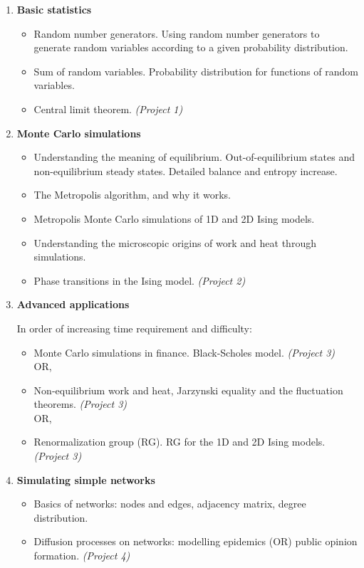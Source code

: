 \documentclass[12pt]{mcplain}
\begin{document}
\begin{enumerate}
    \item \textbf{Basic statistics}
    
    \begin{itemize}
        \item Random number generators. Using random number generators to generate random variables according to a given probability distribution.
        \item Sum of random variables. Probability distribution for functions of random variables.
        \item Central limit theorem. \textit{(Project 1)}
    \end{itemize}
    
    \item \textbf{Monte Carlo simulations}
    
    \begin{itemize}
        \item Understanding the meaning of equilibrium. Out-of-equilibrium states and non-equilibrium steady states. Detailed balance and entropy increase.
        \item The Metropolis algorithm, and why it works.
        \item Metropolis Monte Carlo simulations of 1D and 2D Ising models.
        \item Understanding the microscopic origins of work and heat through simulations.
        \item Phase transitions in the Ising model. \textit{(Project 2)}
        
    \end{itemize}
    
    
    \item \textbf{Advanced applications}
    
    In order of increasing time requirement and difficulty:
    
    \begin{itemize}
        \item Monte Carlo simulations in finance. Black-Scholes model. \textit{(Project 3)}\\
        OR,
        \item Non-equilibrium work and heat, Jarzynski equality and the fluctuation theorems. \textit{(Project 3)}\\
        OR,
        \item Renormalization group (RG). RG for the 1D and 2D Ising models. \textit{(Project 3)}
    \end{itemize}
    
    
    \item \textbf{Simulating simple networks}
    
    \begin{itemize}
        \item Basics of networks: nodes and edges, adjacency matrix, degree distribution.
        \item Diffusion processes on networks: modelling epidemics (OR) public opinion formation. \textit{(Project 4)}
    \end{itemize}    

\end{enumerate}
\end{document}

